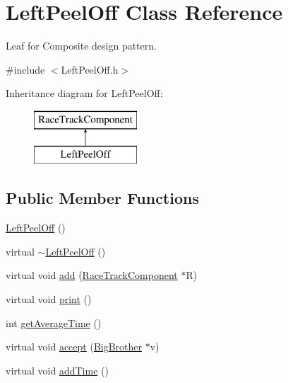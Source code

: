 \hypertarget{class_left_peel_off}{}\section{Left\+Peel\+Off Class Reference}
\label{class_left_peel_off}


Leaf for Composite design pattern.  




{\ttfamily \#include $<$Left\+Peel\+Off.\+h$>$}

Inheritance diagram for Left\+Peel\+Off\+:\begin{figure}[H]
\begin{center}
\leavevmode
\includegraphics[height=2.000000cm]{class_left_peel_off}
\end{center}
\end{figure}
\subsection*{Public Member Functions}
\begin{DoxyCompactItemize}
\item 
\mbox{\hyperlink{class_left_peel_off_ac4d742f0198c55a5a5dd46ebc74ea479}{Left\+Peel\+Off}} ()
\item 
virtual \mbox{\hyperlink{class_left_peel_off_af1283064ef653388d605a1acac67caf3}{$\sim$\+Left\+Peel\+Off}} ()
\item 
virtual void \mbox{\hyperlink{class_left_peel_off_ae1a279fc9522e6f2e6f5a4c879f01a06}{add}} (\mbox{\hyperlink{class_race_track_component}{Race\+Track\+Component}} $\ast$R)
\item 
virtual void \mbox{\hyperlink{class_left_peel_off_aafa7fd3e608c6b08ea8b1bde7447c4f3}{print}} ()
\item 
int \mbox{\hyperlink{class_left_peel_off_aa5eb8bb7d48cf76f7ad2ac2483d3901f}{get\+Average\+Time}} ()
\item 
virtual void \mbox{\hyperlink{class_left_peel_off_a14a125b99c807a7a0961af5be020e641}{accept}} (\mbox{\hyperlink{class_big_brother}{Big\+Brother}} $\ast$v)
\item 
virtual void \mbox{\hyperlink{class_left_peel_off_a579d92a784406a8b4060dec68a832db0}{add\+Time}} ()
\end{DoxyCompactItemize}
